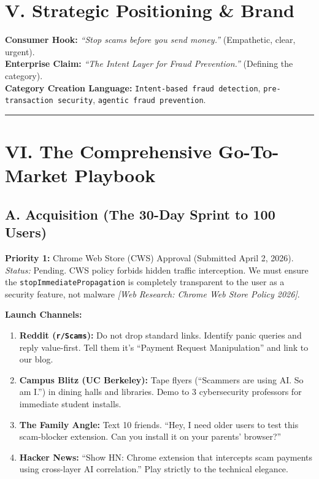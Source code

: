 \documentclass[11pt, letterpaper]{article}
\begin{document}
\section*{V. Strategic Positioning \& Brand}

\textbf{Consumer Hook:} \textit{``Stop scams before you send money.''} (Empathetic, clear, urgent).\\
\textbf{Enterprise Claim:} \textit{``The Intent Layer for Fraud Prevention.''} (Defining the category).\\
\textbf{Category Creation Language:} \texttt{Intent-based fraud detection}, \texttt{pre-transaction security}, \texttt{agentic fraud prevention}.

\vspace{12pt}
\hrule
\vspace{12pt}

\section*{VI. The Comprehensive Go-To-Market Playbook}

\subsection*{A. Acquisition (The 30-Day Sprint to 100 Users)}
\textbf{Priority 1:} Chrome Web Store (CWS) Approval (Submitted April 2, 2026).\\
\textit{Status:} Pending. CWS policy forbids hidden traffic interception. We must ensure the \texttt{stopImmediatePropagation} is completely transparent to the user as a security feature, not malware \textit{[Web Research: Chrome Web Store Policy 2026]}.

\textbf{Launch Channels:}
\begin{enumerate}
    \item \textbf{Reddit (\texttt{r/Scams}):} Do not drop standard links. Identify panic queries and reply value-first. Tell them it's ``Payment Request Manipulation'' and link to our blog.
    \item \textbf{Campus Blitz (UC Berkeley):} Tape flyers (``Scammers are using AI. So am I.'') in dining halls and libraries. Demo to 3 cybersecurity professors for immediate student installs.
    \item \textbf{The Family Angle:} Text 10 friends. ``Hey, I need older users to test this scam-blocker extension. Can you install it on your parents' browser?''
    \item \textbf{Hacker News:} ``Show HN: Chrome extension that intercepts scam payments using cross-layer AI correlation.'' Play strictly to the technical elegance.
\end{enumerate}
\end{document}
